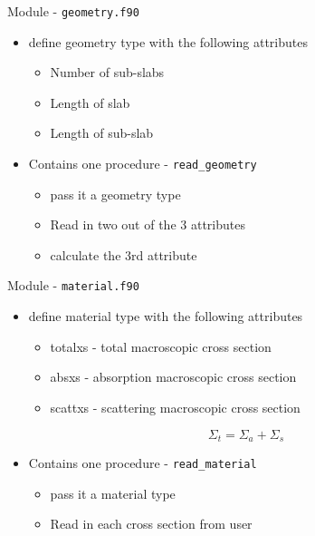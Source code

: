 \documentclass{beamer}
\begin{document}
\begin{frame}{Module - \texttt{geometry.f90}}

  \begin{itemize}
    \item define geometry type with the following attributes
    \begin{itemize}
      \item Number of sub-slabs
      \vfill\item Length of slab
      \vfill\item Length of sub-slab
    \end{itemize}
    \vfill \item Contains one procedure - \texttt{read\_geometry}
    \begin{itemize}
      \item pass it a geometry type
      \vfill\item Read in two out of the 3 attributes
      \vfill\item calculate the 3rd attribute
    \end{itemize}
  \end{itemize}

\end{frame}
\begin{frame}{Module - \texttt{material.f90}}

  \begin{itemize}
    \item define material type with the following attributes
    \begin{itemize}
      \item totalxs - total macroscopic cross section
      \vfill\item absxs - absorption macroscopic cross section
      \vfill\item scattxs - scattering macroscopic cross section
    \end{itemize}
    \vfill
    \[ \Sigma_{t} = \Sigma_{a} + \Sigma_{s} \]
    \vfill \item Contains one procedure - \texttt{read\_material}
    \begin{itemize}
      \item pass it a material type
      \vfill\item Read in each cross section from user
    \end{itemize}
  \end{itemize}

\end{frame}
\end{document}
